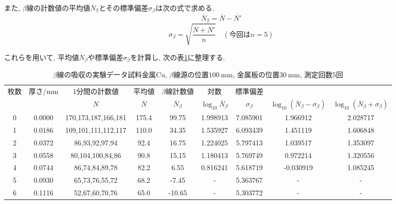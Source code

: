 \documentclass{jarticle}
\begin{document}
また, $\beta$線の計数値の平均値$\overline{N}_\mathrm{\beta}$とその標準偏差$\sigma_\beta$は次の式で求める.
\begin{equation}
  \overline{N}_\mathrm{\beta} = \overline{N} - \overline{N'}
  \label{eq:beta-passing}
\end{equation}
\begin{equation}
  \sigma_\beta = \sqrt{\frac{\overline{N} + \overline{N'}}{n}} \quad (今回はn = 5)
  \label{eq:beta-passing-log10}
\end{equation}

これらを用いて, 平均値$\overline{N}_\beta$や標準偏差$\sigma_\beta$を計算し, 次の表\ref{tb:absorption-Cu}に整理する.

\begin{table}[H]
  \caption{$\beta$線の吸収の実験データ\protect\linebreak 試料金属$\mathrm{Cu}$, $\beta$線源の位置$100\ \mathrm{mm}$, 金属板の位置$30\ \mathrm{mm}$, 測定回数$5$回}
  \label{tb:absorption-Cu}
  \small
  \hspace{-3.3cm}
  \begin{tabular}{ccccccccc}
    \hline
    枚数 & 厚さ$/\mathrm{mm}$ & $1$分間の計数値 & 平均値 & $\beta$線計数値 & 対数 & 標準偏差 & & \\
    & & $N$ & $\overline{N}$ & $\overline{N}_\beta$ & $\log_{10} \overline{N}_\beta$ & $\sigma_\beta$ & $\log_{10} (\overline{N}_\beta - \sigma_\beta)$ & $\log_{10} (\overline{N}_\beta + \sigma_\beta)$ \\
    \hline
    0 & 0.0000 & 170,173,187,166,181 & 175.4 & 99.75 & 1.998913 & 7.085901 & 1.966912 & 2.028717 \\
    1 & 0.0186 & 109,101,111,112,117 & 110.0 & 34.35 & 1.535927 & 6.093439 & 1.451119 & 1.606848 \\
    2 & 0.0372 & 86,93,92,97,94 & 92.4 & 16.75 & 1.224025 & 5.797413 & 1.039517 & 1.353097 \\
    3 & 0.0558 & 80,104,100,84,86 & 90.8 & 15.15 & 1.180413 & 5.769749 & 0.972214 & 1.320556 \\
    4 & 0.0744 & 86,74,84,89,78 & 82.2 & 6.55 & 0.816241 & 5.618719 & -0.030919 & 1.085245 \\
    5 & 0.0930 & 65,73,76,55,72 & 68.2 & -7.45 & - & 5.363767 & - & - \\
    6 & 0.1116 & 52,67,60,70,76 & 65.0 & -10.65 & - & 5.303772 & - & - \\
    \hline
  \end{tabular}
\end{table}
\end{document}
